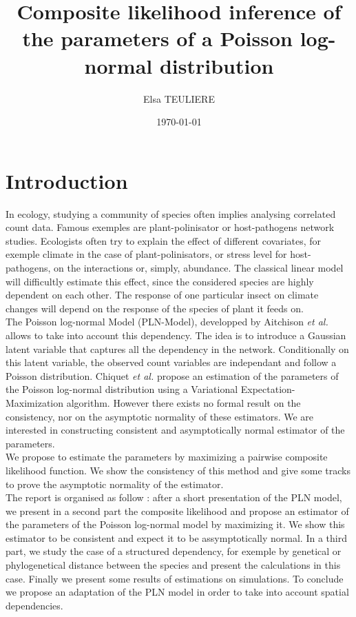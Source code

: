 \documentclass[11pt, a4paper]{article}
\title{	
Composite likelihood inference of the parameters of a Poisson log-normal distribution
}
\date{\today}
\author{Elsa TEULIERE}
\begin{document}
\maketitle
\vspace{1cm}
\section*{Introduction}
\indent In ecology, studying a community of species often implies analysing correlated count data. Famous exemples are plant-polinisator or host-pathogens network studies. Ecologists often try to explain the effect of different covariates, for exemple climate in the case of plant-polinisators, or stress level for host-pathogens, on the interactions or, simply, abundance. The classical linear model will difficultly estimate this effect, since the considered species are highly dependent on each other. The response of one particular insect on climate changes will depend on the response of the species of plant it feeds on.\\

The Poisson log-normal Model (PLN-Model), developped by Aitchison \textit{et al.}\cite{aitchison1989multivariate} allows to take into account this dependency. The idea is to introduce a Gaussian latent variable that captures all the dependency in the network. Conditionally on this latent variable, the observed count variables  are independant and follow a Poisson distribution. Chiquet \textit{et al.} \cite{chiquet2017variational} propose an estimation of the parameters of the Poisson log-normal distribution using a Variational Expectation-Maximization algorithm. However there exists no formal result on the consistency, nor on the asymptotic normality of these estimators. We are interested in constructing  consistent and asymptotically normal estimator of the parameters.\\

 We propose to estimate the parameters by maximizing a pairwise composite likelihood function. We show the consistency of this method and give some tracks to prove the asymptotic normality of the estimator. \\ 

The report is organised as follow : after a short presentation of the PLN model,  we present in a second part the composite likelihood and propose an estimator of the parameters of the Poisson log-normal model by maximizing it. We show this estimator to be consistent and expect it to be assymptotically normal. In a third part, we study the case of a structured dependency, for exemple by genetical or phylogenetical distance between the species  and present the calculations in this case. Finally we present some results of estimations on simulations. To conclude we propose an adaptation of the PLN model in order to take into account spatial dependencies. 
\end{document}
